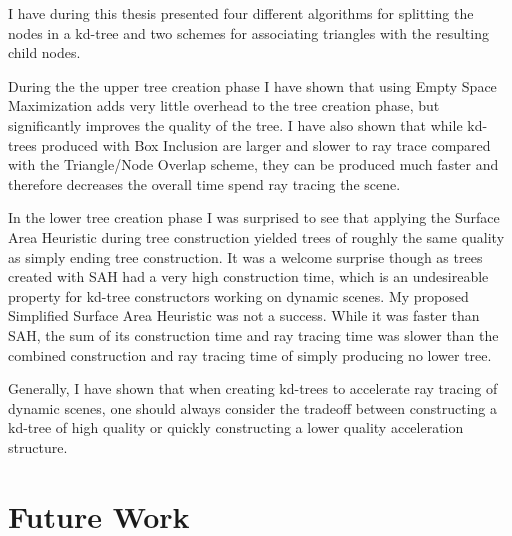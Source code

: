 
I have during this thesis presented four different algorithms for splitting the
nodes in a kd-tree and two schemes for associating triangles with the resulting
child nodes.

During the the upper tree creation phase I have shown that using Empty Space
Maximization adds very little overhead to the tree creation phase, but
significantly improves the quality of the tree. I have also shown that while
kd-trees produced with Box Inclusion are larger and slower to ray trace compared
with the Triangle/Node Overlap scheme, they can be produced much faster and
therefore decreases the overall time spend ray tracing the scene.

In the lower tree creation phase I was surprised to see that applying the
Surface Area Heuristic during tree construction yielded trees of roughly the
same quality as simply ending tree construction. It was a welcome surprise
though as trees created with SAH had a very high construction time, which is an
undesireable property for kd-tree constructors working on dynamic scenes. My
proposed Simplified Surface Area Heuristic was not a success. While it was
faster than SAH, the sum of its construction time and ray tracing time was
slower than the combined construction and ray tracing time of simply producing
no lower tree.



Generally, I have shown that when creating kd-trees to accelerate ray tracing of
dynamic scenes, one should always consider the tradeoff between constructing a
kd-tree of high quality or quickly constructing a lower quality acceleration
structure.








\chapter{Future Work}\label{chp:future}


